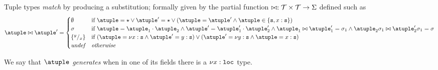 Tuple types \emph{match} by producing a substitution; formally given
by the partial function
$\matches : \tupleset \times \tupleset \to \Sigma$ defined 
such as
\[
  \atuple \matches \atuple' \generates
    \begin{cases}
     \emptyset
    & 
    \text{if  } \atuple = \wildcard \vee \atuple' = \wildcard  \vee (\atuple = \atuple' \land \atuple\in\{\asort, x : \asort\})
    \\
    \sigma
    &
    \text{if } \atuple = \atuple_1 \cdot \atuple_2
    \land  \atuple' = \atuple'_1 \cdot \atuple'_2
    \land \atuple_1 \matches \atuple'_1 \generates \sigma_1
    \land \atuple_2\sigma_1 \matches \atuple'_2\sigma_1 \generates \sigma
    \\
    \sust x y 
    &
    \text{if  } (\atuple = \nu x : \asort \land \atuple' = y: \asort) \vee  (\atuple' = \nu y : \asort \land \atuple = x: \asort) 
    \\
    \textit{undef} & \textit{otherwise}
   \end{cases}
\]

%
%


%
We say that $\atuple$ \emph{generates} when in one of its fields there
is a $\nu x: \asort[loc]$ type. 
%

%


